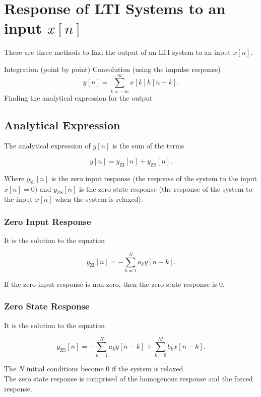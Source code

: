 \documentclass{report}
\begin{document}
\section{Response of LTI Systems to an input $x[n]$}

There are three methods to find the output of an LTI system to an input $x[n]$.

\begin{enumerate}
	\ii Integration (point by point)
	\ii Convolution (using the impulse response)
	\[
		y[n] = \sum_{k=-\infty}^{\infty} x[k]h[n-k]
		.\]
	\ii Finding the analytical expression for the output
\end{enumerate}

\subsection{Analytical Expression}

The analytical expression of $y[n]$ is the sum of the terms

\[
	y[n] = y_\text{ZI}[n] + y_\text{ZS}[n]
	.\]

Where $y_\text{ZI}[n]$ is the zero input response (the response of the system to the input $x[n]=0$) and $y_\text{ZS}[n]$ is the zero state response (the response of the system to the input $x[n]$ when the system is relaxed).

\subsubsection{Zero Input Response}

It is the solution to the equation

\[
	y_\text{ZI}[n] = - \sum_{k=1}^{N} a_k y[n-k]
	.\]

If the zero input response is non-zero, then the zero state response is 0.

\subsubsection{Zero State Response}

It is the solution to the equation

\[
	y_\text{ZS}[n] = - \sum_{k=1}^{N} a_k y[n-k] + \sum_{k=0}^{M} b_k x[n-k]
	.\]

The $N$ initial conditions become 0 if the system is relaxed. \\

The zero state response is comprised of the homogenous response and the forced response.
\end{document}
